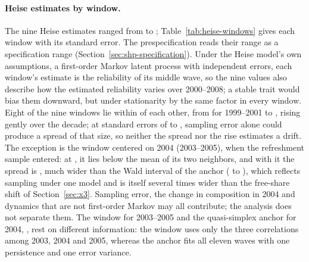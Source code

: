 \paragraph{Heise estimates by window.}
The nine Heise estimates ranged from  to ; Table~\ref{tab:heise-windows} gives each window with its standard error. The prespecification reads their range as a specification range (Section~\ref{sec:shp-specification}). Under the Heise model's own assumptions, a first-order Markov latent process with independent errors, each window's estimate is the reliability of its middle wave, so the nine values also describe how the estimated reliability varies over 2000--2008; a stable trait would bias them downward, but under stationarity by the same factor in every window. Eight of the nine windows lie within  of each other, from  for 1999--2001 to , rising gently over the decade; at standard errors of  to , sampling error alone could produce a spread of that size, so neither the spread nor the rise estimates a drift. The exception is the window centered on 2004 (2003--2005), when the refreshment sample entered: at , it lies  below the mean of its two neighbors, and with it the spread is , much wider than the Wald interval of the anchor ( to ), which reflects sampling under one model and is itself several times wider than the free-share shift of Section~\ref{sec:x3}. Sampling error, the change in composition in 2004 and dynamics that are not first-order Markov may all contribute; the analysis does not separate them. The window for 2003--2005 and the quasi-simplex anchor for 2004, , rest on different information: the window uses only the three correlations among 2003, 2004 and 2005, whereas the anchor fits all eleven waves with one persistence and one error variance.

